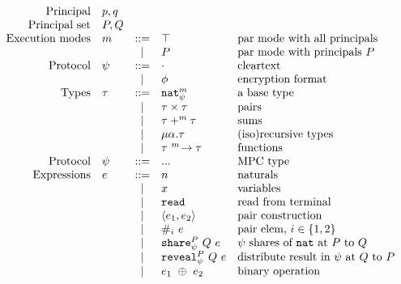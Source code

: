 \documentclass[10pt]{article}
\newcommand{\kw}[1]{\ensuremath{\mathtt{#1}}}
\newcommand{\tnat}{\ensuremath{\mathtt{nat}}}
\newcommand{\tfun}[3]{\ensuremath{{#1} ~^{#3}\!\rightarrow {#2}}}
\newcommand{\tprod}[2]{\ensuremath{{#1} \times {#2}}}
\newcommand{\tsum}[3]{\ensuremath{{#1} +^{#3} {#2}}}
\newcommand{\trec}[2]{\ensuremath{\mu {#1}.{#2}}}
\newcommand{\ebinop}[2]{\ensuremath{{#1}~\oplus~{#2}}}
\newcommand{\ereveal}[4]{\ensuremath{\kw{reveal}^{#1}_{#4}~{#2}~{#3}}}
\newcommand{\eshare}[4]{\ensuremath{\kw{share}^{#2}_{#1}~{#3}~{#4}}}
\newcommand{\eread}{\ensuremath{\kw{read}}}
\newcommand{\epair}[2]{\ensuremath{\langle {#1}, {#2} \rangle}}
\newcommand{\eproj}[2]{\ensuremath{\kw{\#}}_{#1}~{#2}}
\begin{document}
\begin{figure}[h]
  \centering
  \[\begin{array}{rlcll}
      \text{Principal} & p, q \\
      \text{Principal set} & P, Q \\
    \text{Execution modes} & m  & ::=  & \top & \text{par mode with all principals}\\
                       && \mid & P & \text{par mode with principals $P$} \\
      \text{Protocol} & \psi & ::= & \cdot & \text{cleartext} \\
                       && \mid & \phi & \text{encryption format} \\
      \text{Types} & \tau & ::=  & \tnat^m_\psi & \text{a base type} \\
                       && \mid & \tprod{\tau}{\tau} & \text{pairs} \\
                       && \mid & \tsum{\tau}{\tau}{m} & \text{sums} \\
                       && \mid & \trec{\alpha}{\tau} & \text{(iso)recursive types} \\
                       && \mid & \tfun{\tau}{\tau}{m} & \text{functions} \\
      \text{Protocol} & \psi & ::= & ... & \text{MPC type} \\
      \text{Expressions} & e & ::= & n & \text{naturals} \\
                       && \mid & x & \text{variables} \\
                       && \mid & \eread & \text{read from terminal}\\
                       && \mid & \epair{e_1}{e_2} & \text{pair construction}\\
                       && \mid & \eproj{i}{e} & \text{pair elem, }i \in \{1,2\}\\
                       && \mid & \eshare{\psi}{P}{Q}{e} & \text{$\psi$ shares of {\tnat} at $P$ to $Q$} \\
                       && \mid & \ereveal{P}{Q}{e}{\psi} & \text{distribute result in $\psi$ at $Q$ to $P$}\\
                       && \mid & \ebinop{e_1}{e_2}  & \text{binary operation} \\

\end{array}\]
\end{figure}
\end{document}

